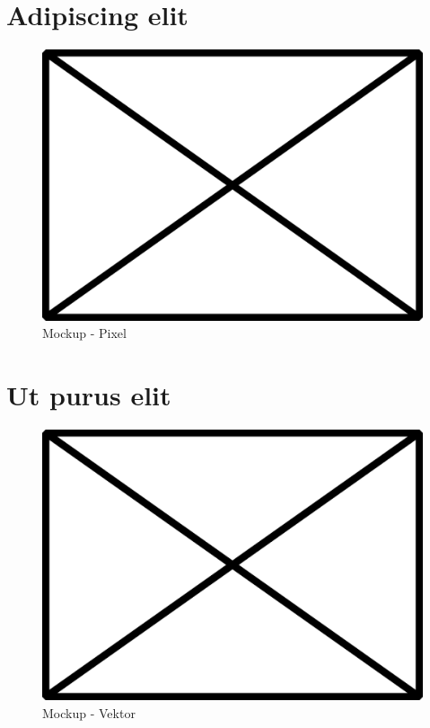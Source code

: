 \section{Adipiscing elit}
\lipsum[4]

\begin{figure}[H]
   \centering
   \includegraphics[width=14cm]{images/mockup_pixel.png}
   \caption{Mockup - Pixel}
\end{figure}

\section{Ut purus elit}
\lipsum[7]

\begin{figure}[H]
   \centering
   \includegraphics[width=14cm]{images/mockup_vector.eps}
   \caption{Mockup - Vektor}
\end{figure}

